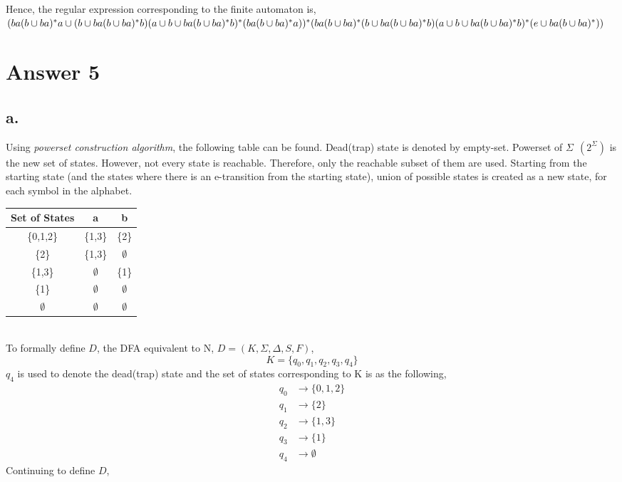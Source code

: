 \documentclass[12pt]{article}
\begin{document}
Hence, the regular expression corresponding to the finite automaton is,\\
$(ba(b\cup ba)^*a\cup (b\cup ba(b\cup ba)^*b)(a\cup b\cup ba(b\cup ba)^*b)^*(ba(b\cup ba)^*a))^*\\(ba(b\cup ba)^*(b\cup ba(b\cup ba)^*b)(a\cup b\cup ba(b\cup ba)^*b)^*(e\cup ba(b\cup ba)^*))$
\section*{Answer 5}
\subsection*{a.}
Using \textit{powerset construction algorithm}, the following table can be found. Dead(trap) state is denoted by empty-set. Powerset of $\Sigma~~(2^\Sigma)$ is the new set of states.  However, not every state is reachable. Therefore, only the reachable subset of them are used. Starting from the starting state (and the states where there is an e-transition from the starting state), union of possible states is created as a new state, for each symbol in the alphabet.
\begin{table*}[!h]
\centering
\begin{tabular}{c|c|c}
 Set of States  & a       & b       \\\hline
\{0,1,2\} & \{1,3\} & \{2\}  \\\hline
\{2\}     & \{1,3\} & $\emptyset$        \\\hline
\{1,3\}   &    $\emptyset$     & \{1\}   \\\hline
\{1\}     &     $\emptyset$    &    $\emptyset$\\\hline
$\emptyset$ & $\emptyset$ & $\emptyset$
\end{tabular}
\end{table*}
\\
To formally define $D$, the DFA equivalent to N, $D = (K, \Sigma, \Delta, S, F)$,
\[
K = \{q_0, q_1, q_2, q_3, q_4\}
\]
$q_4$ is used to denote the dead(trap) state and the set of states corresponding to K is as the following,
\begin{align*}
    q_0 &\rightarrow \{0,1,2\}\\
    q_1 &\rightarrow \{2\}\\
    q_2 &\rightarrow \{1,3\}\\
    q_3 &\rightarrow \{1\}\\
    q_4 &\rightarrow \emptyset
\end{align*}
Continuing to define $D$,\\~\\
\end{document}
